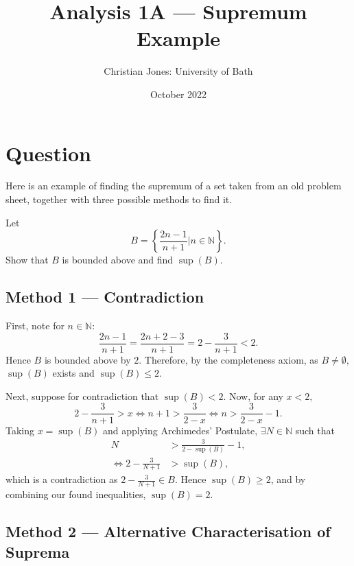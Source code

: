 \documentclass[
  10pt,
  a4paper]{article}
\title{Analysis 1A --- Supremum Example}
\author{Christian Jones: University of Bath}
\date{October 2022}
\theoremstyle{plain}
\theoremstyle{definition}
\theoremstyle{plain}
\theoremstyle{plain}
\theoremstyle{plain}
\theoremstyle{plain}
\theoremstyle{definition}
\theoremstyle{definition}
\newtheorem*{Order Axioms*}{Order Axioms}\newtheorem{Order Axioms}{Order Axioms}[section]
\theoremstyle{remark}
\theoremstyle{remark}
\let\BeginKnitrBlock\begin \let\EndKnitrBlock\end
\begin{document}
\maketitle

{
\setcounter{tocdepth}{2}
\tableofcontents
}
\newpage
{}

\hypertarget{question}{%
\section*{Question}\label{question}}

Here is an example of finding the supremum of a set taken from an old problem sheet, together with three possible methods to find it.
\BeginKnitrBlock{example}
{\label{exm:unnamed-chunk-2} }Let \[B = \left\lbrace \frac{2n-1}{n+1} \lvert n \in \mathbb{N}\right\rbrace.\] Show that \(B\) is bounded above and find \(\sup(B).\)
\EndKnitrBlock{example}

\hypertarget{method-1-contradiction}{%
\subsection*{Method 1 --- Contradiction}\label{method-1-contradiction}}

\BeginKnitrBlock{solution*}
First, note for \(n\in\mathbb{N}\): \[\frac{2n-1}{n+1} = \frac{2n+2-3}{n+1} = 2 - \frac{3}{n+1} < 2.\] Hence \(B\) is bounded above by \(2\). Therefore, by the completeness axiom, as \(B \neq \emptyset,\) \(\sup(B)\) exists and \(\sup(B) \leq 2.\)

Next, suppose for contradiction that \(\sup(B) < 2\). Now, for any \(x < 2,\) \[2 - \frac{3}{n+1} > x \Leftrightarrow n+1 > \frac{3}{2-x} \Leftrightarrow n > \frac{3}{2-x} - 1.\] Taking \(x = \sup(B)\) and applying Archimedes' Postulate, \(\exists N \in \mathbb{N}\) such that
\begin{align*}
N &> \frac{3}{2-\sup(B)} - 1,\\
\Leftrightarrow 2 - \frac{3}{N+1} &> \sup(B),
\end{align*}
which is a contradiction as \(2 - \frac{3}{N+1} \in B.\) Hence \(\sup(B) \geq 2\), and by combining our found inequalities, \(\sup(B)=2\).
\EndKnitrBlock{solution*}

\hypertarget{method-2-alternative-characterisation-of-suprema}{%
\subsection*{Method 2 --- Alternative Characterisation of Suprema}\label{method-2-alternative-characterisation-of-suprema}}
\end{document}
